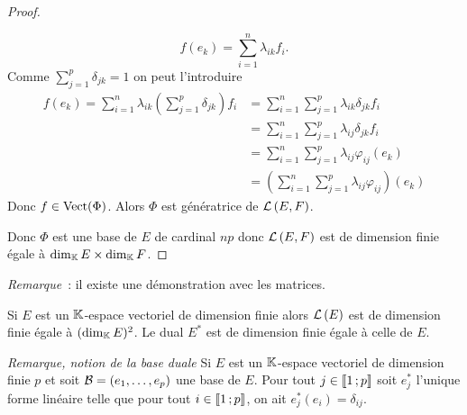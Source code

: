 \begin{proof}
\begin{enumerate}
    \begin{equation}
      f(e_k)= \sum_{i=1}^n \lambda_{ik} f_i.
    \end{equation}
    Comme \(\sum_{j=1}^p \delta_{jk}=1\) on peut l'introduire
    \begin{align}
      f(e_k) = \sum_{i=1}^n \lambda_{ik} \left(\sum_{j=1}^p \delta_{jk}\right) f_i &= \sum_{i=1}^n \sum_{j=1}^p \lambda_{ik} \delta_{jk} f_i \\
      &=\sum_{i=1}^n \sum_{j=1}^p \lambda_{ij} \delta_{jk} f_i\\
      &=\sum_{i=1}^n \sum_{j=1}^p \lambda_{ij} \varphi_{ij}(e_k)\\
      &=\left(\sum_{i=1}^n \sum_{j=1}^p \lambda_{ij} \varphi_{ij}\right)(e_k)
    \end{align}
    Donc \(f \in \operatorname{Vect}(\Phi)\). Alors \(\Phi\) est génératrice de \(\mathcal{L}\left(E,F\right)\).
  \end{enumerate}
  Donc \(\Phi\) est une base de \(E\) de cardinal \(np\) donc \(\mathcal{L}\left(E,F\right)\) est de dimension finie égale à \(\operatorname{dim}_{\mathbb{K}} E \times \operatorname{dim}_{\mathbb{K}} F\).
\end{proof}

\emph{Remarque}~: il existe une démonstration avec les matrices.

\begin{corth}
  Si \(E\) est un \(\mathbb{K}\)-espace vectoriel de dimension finie alors \(\mathcal{L}\left(E\right)\) est de dimension finie égale à \((\operatorname{dim}_{\mathbb{K}} E)^2\). Le dual \(E^*\) est de dimension finie égale à celle de \(E\).
\end{corth}

\emph{Remarque, notion de la base duale} Si \(E\) est un \(\mathbb{K}\)-espace vectoriel de dimension finie \(p\) et soit \(\mathcal{B}=(e_1, \ldots, e_p)\) une base de \(E\). Pour tout \(j \in  \mathopen{\llbracket}1\mathclose{}\mathpunct{};p\mathclose{\rrbracket}\) soit \(e_j^*\) l'unique forme linéaire telle que pour tout \(i \in  \mathopen{\llbracket}1\mathclose{}\mathpunct{};p\mathclose{\rrbracket}\), on ait \(e_j^*(e_i)=\delta_{ij}\).

